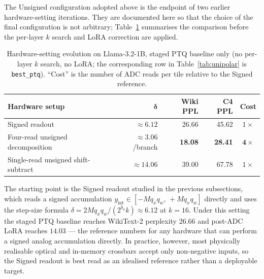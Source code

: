 \documentclass[a4paper,11pt,oneside]{article}
\theoremstyle{breakstyle}
\begin{document}
  The Unsigned configuration adopted above is the endpoint of two
  earlier hardware-setting iterations.  They are documented here
  so that the choice of the final configuration is not arbitrary;
  Table~\ref{tab:hardware_evolution} summarises the comparison
  before the per-layer $k$ search and LoRA correction are
  applied.

  \begin{table}[htbp]
    \centering
    \caption{Hardware-setting evolution on Llama-3.2-1B, staged
      PTQ baseline only (no per-layer $k$ search, no LoRA; the
      corresponding row in Table~\ref{tab:unipolar} is
      \texttt{best\_ptq}).  ``Cost'' is the number of ADC reads per
      tile relative to the Signed reference.}
    \label{tab:hardware_evolution}
    \renewcommand{\arraystretch}{1.2}
    \begin{tabular}{@{}lrrrc@{}}
      \toprule
      \textbf{Hardware setup} & $\boldsymbol{\delta}$ &
        \textbf{Wiki PPL} & \textbf{C4 PPL} &
        \textbf{Cost} \\
      \midrule
      Signed readout                       & $\approx 6.12$         & 26.66 & 45.62 & $1\times$ \\
      Four-read unsigned decomposition     & $\approx 3.06$/branch  & \textbf{18.08} & \textbf{28.41} & $\mathbf{4\times}$ \\
      Single-read unsigned shift-subtract  & $\approx 14.06$        & 39.00 & 67.78 & $1\times$ \\
      \bottomrule
    \end{tabular}
  \end{table}

  The starting point is the Signed readout studied in the previous
  subsections, which reads a signed accumulation
  $y_{\mathrm{int}} \in [-M q_x q_w,\, +M q_x q_w]$ directly and uses
  the step-size formula $\delta = 2 M q_x q_w / (2^{b_a} k) \approx 6.12$
  at $k = 16$.
  Under this setting the staged PTQ baseline reaches WikiText-2
  perplexity $26.66$ and post-ADC LoRA reaches $14.03$ --- the
  reference numbers for any hardware that can perform a signed
  analog accumulation directly.  In practice, however, most
  physically realisable optical and in-memory crossbars accept only
  non-negative inputs, so the Signed readout is best read as an
  idealised reference rather than a deployable target.
\end{document}
